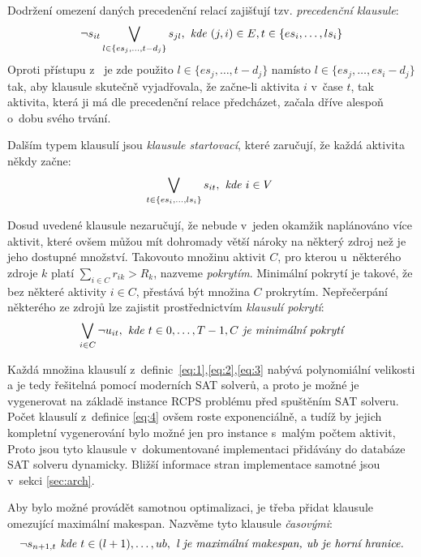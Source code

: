 \documentclass[a4paper, 12pt]{article}
\begin{document}
Dodržení omezení daných precedenční relací zajišťují tzv. \emph{precedenční klausule}:
\begin{equation}
\label{eq:2}
   \neg s_{it} \bigvee_{l\in\{es_j,\ldots,t-d_j\}} s_{jl},\emph{ kde } (j,i) \in E, t \in\{es_i,\ldots,ls_i\}   
\end{equation}
Oproti přístupu z~\cite{horbach:10} je zde použito $l\in\{es_j,\ldots,t-d_j\}$ namísto $l\in\{es_j,\ldots,es_i-d_j\}$ tak,
aby klausule skutečně vyjadřovala, že začne-li aktivita $i$ v~čase $t$, tak aktivita, která ji má dle precedenční
relace předcházet, začala dříve alespoň o~dobu svého trvání.

Dalším typem klausulí jsou \emph{klausule startovací}, které zaručují, že každá aktivita někdy začne:
\begin{equation}
\label{eq:3}
   \bigvee_{t\in\{es_i,\ldots,ls_{i}\}} s_{it},\emph{ kde } i \in
V~\end{equation}

Dosud uvedené klausule nezaručují, že nebude v~jeden okamžik naplánováno více aktivit, které ovšem můžou mít dohromady
větší nároky na některý zdroj než je jeho dostupné množství.
Takovouto množinu aktivit $C$, pro kterou u~některého zdroje $k$ platí $\sum_{i\in C} r_{ik} > R_k$, nazveme \emph{pokrytím}.
Minimální pokrytí je takové, že bez některé aktivity $i\in C$, přestává být množina $C$ prokrytím.
Nepřečerpání některého ze zdrojů lze zajistit prostřednictvím \emph{klausulí pokrytí}:
\begin{equation}
\label{eq:4}
   \bigvee_{i\in C} \neg u_{it},\emph{ kde } t\in{0,\ldots,T-1}, C \emph{ je minimální pokrytí}   
\end{equation}

Každá množina klausulí z~definic~\ref{eq:1},\ref{eq:2},\ref{eq:3} nabývá polynomiální velikosti a je tedy řešitelná pomocí moderních SAT solverů,
a proto je možné je vygenerovat na základě instance RCPS problému před spuštěním SAT solveru.
Počet klausulí z~definice \ref{eq:4} ovšem roste exponenciálně, a tudíž by jejich kompletní vygenerování bylo možné jen pro instance
s~malým počtem aktivit,
Proto jsou tyto klausule v~dokumentované implementaci přidávány do databáze SAT solveru dynamicky.
Bližší informace stran implementace samotné jsou v~sekci \ref{sec:arch}.

Aby bylo možné provádět samotnou optimalizaci, je třeba přidat klausule omezující maximální makespan.
Nazvěme tyto klausule \emph{časovými}:
\begin{equation}
\label{eq:5}
   \neg s_{n+1,t}\emph{ kde } t\in{(l+1),\ldots, ub}, \emph{ l je maximální makespan, ub je horní hranice.}
\end{equation}
\end{document}
